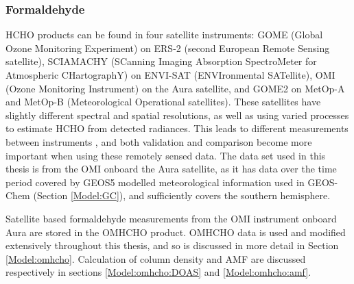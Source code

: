     
    
    
    
    \subsubsection{Formaldehyde}
      
      HCHO products can be found in four satellite instruments: GOME (Global Ozone Monitoring Experiment) on ERS-2 (second European Remote Sensing satellite), SCIAMACHY (SCanning Imaging Absorption SpectroMeter for Atmospheric CHartographY) on ENVI-SAT (ENVIronmental SATellite), OMI (Ozone Monitoring Instrument) on the Aura satellite, and GOME2 on MetOp-A and MetOp-B (Meteorological Operational satellites).
      These satellites have slightly different spectral and spatial resolutions, as well as using varied processes to estimate HCHO from detected radiances.
      This leads to different measurements between instruments \parencite{Lorente2017}, and both validation and comparison become more important when using these remotely sensed data.
      The data set used in this thesis is from the OMI onboard the Aura satellite, as it has data over the time period covered by GEOS5 modelled meteorological information used in GEOS-Chem (Section \ref{Model:GC}), and sufficiently covers the southern hemisphere.
      
      Satellite based formaldehyde measurements from the OMI instrument onboard Aura are stored in the OMHCHO product.
      OMHCHO data is used and modified extensively throughout this thesis, and so is discussed in more detail in Section \ref{Model:omhcho}.
      Calculation of column density and AMF are discussed respectively in sections \ref{Model:omhcho:DOAS} and \ref{Model:omhcho:amf}.
      
      
